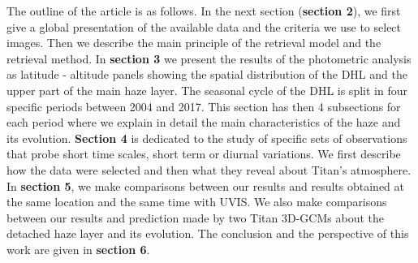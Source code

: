 The outline of the article is as follows. In the next section (\textbf{section 2}), we first give a global presentation of
the available data and the criteria we use to select images.
Then we describe the main principle of the retrieval model and the retrieval method.
In \textbf{section 3} we present the results of the photometric analysis as latitude -
altitude panels showing the spatial distribution of the DHL and the upper part of the main haze layer.
The seasonal cycle of the DHL is split in four specific periods between 2004 and 2017.
This section has then 4 subsections for each period where we explain in detail the main characteristics of the haze and
its evolution.
\textbf{Section 4} is dedicated to the study of specific sets of observations that probe short time scales,
short term or diurnal variations. We first describe how the data were selected and then what they reveal about Titan's atmosphere.
In \textbf{section 5}, we make comparisons between our results and results obtained at the same location and the same time with UVIS.
We also make comparisons between our results and prediction made by two Titan 3D-GCMs about the detached haze layer and its evolution.
The conclusion and the perspective of this work are given in \textbf{section 6}.
